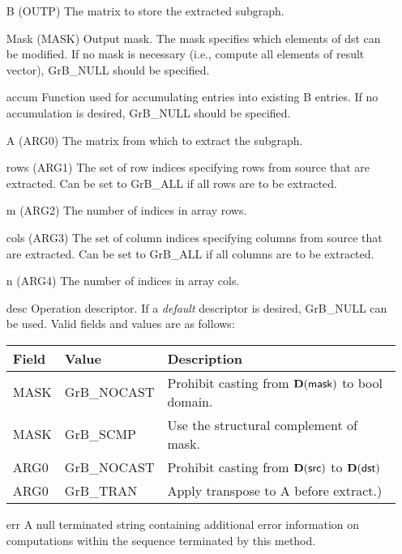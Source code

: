\begin{itemize}[leftmargin=1in]
    \item[{\sf B}]   ({\sf OUTP}) The matrix to store the extracted subgraph.

    \item[{\sf Mask}] ({\sf MASK}) Output mask. The mask
    specifies which elements of {\sf dst} can be modified.
    If no mask is necessary (i.e., compute all elements of result
    vector), {\sf GrB\_NULL} should be specified.

    \item[{\sf accum}]  Function used for accumulating entries into existing {\sf B} entries. 
			If no accumulation is desired, {\sf GrB\_NULL} should be specified.

    \item[{\sf A}]   ({\sf ARG0}) The matrix from which to extract the subgraph.
    \item[{\sf rows}]     ({\sf ARG1}) The set of row indices specifying rows from source that
                              are extracted. Can
                              be set to {\sf GrB\_ALL} if all rows are
                              to be extracted.
    \item[{\sf m}]     ({\sf ARG2}) The number of indices in array {\sf rows}.
    \item[{\sf cols}]     ({\sf ARG3}) The set of column indices specifying
                              columns from source that are extracted. Can
                              be set to {\sf GrB\_ALL} if all columns are
                              to be extracted.
    \item[{\sf n}]     ({\sf ARG4}) The number of indices in array {\sf cols}.

    \item[{\sf desc}]   Operation descriptor. If a
    \emph{default} descriptor is desired, {\sf GrB\_NULL} can be
    used.  Valid fields and values are as follows: \\
    \begin{tabular}{lll}
    Field  & Value & Description \\
    \hline
    {\sf MASK} & {\sf GrB\_NOCAST} & Prohibit casting from $\bold{D}({\sf mask})$ to {\sf bool} domain. \\
    {\sf MASK} & {\sf GrB\_SCMP}   & Use the structural complement of {\sf mask}. \\
    {\sf ARG0} & {\sf GrB\_NOCAST} & Prohibit casting from $\bold{D}({\sf src})$ to $\bold{D}({\sf dst})$ \\
    {\sf ARG0} & {\sf GrB\_TRAN}   & Apply transpose to {\sf A} before extract.) \\
    \end{tabular}
    \item[{\sf err}]     A null terminated string containing additional error
                         information on computations within the sequence 
                         terminated by this method. 
\end{itemize}

